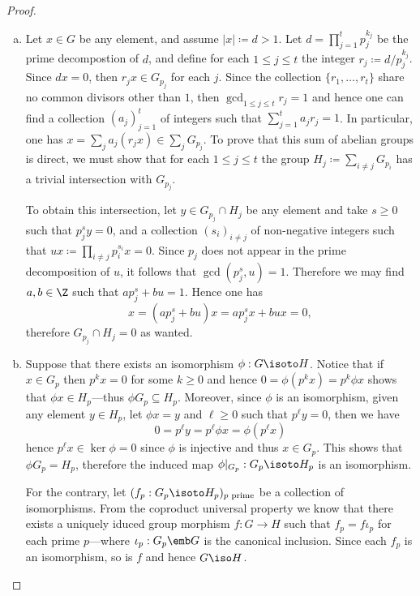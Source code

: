 \begin{proof}
\begin{enumerate}[(a)]\setlength\itemsep{0em}
\item Let \(x \in G\) be any element, and assume \(|x| \coloneq d > 1\). Let
  \(d = \prod_{j=1}^t p_j^{k_j}\) be the prime decompostion of \(d\), and define
  for each \(1 \leq j \leq t\) the integer \(r_j \coloneq d/p_j^{k_j}\). Since
  \(d x = 0\), then \(r_j x \in G_{p_j}\) for each \(j\). Since the collection
  \(\{r_1, \dots, r_t\}\) share no common divisors other than \(1\), then
  \(\gcd_{1 \leq j \leq t} r_j = 1\) and hence one can find a collection
  \((a_j)_{j=1}^t\) of integers such that \(\sum_{j=1}^t a_j r_j = 1\). In
  particular, one has \(x = \sum_j a_j (r_j x) \in \sum_j G_{p_j}\). To prove
  that this sum of abelian groups is direct, we must show that for each
  \(1 \leq j \leq t\) the group \(H_j \coloneq \sum_{i \neq j} G_{p_i}\) has a
  trivial intersection with \(G_{p_j}\).

  To obtain this intersection, let \(y \in G_{p_j} \cap H_j\) be any element and
  take \(s \geq 0\) such that \(p_j^s y = 0\), and a collection
  \((s_i)_{i \neq j}\) of non-negative integers such that
  \(u x \coloneq \prod_{i \neq j} p_i^{s_i} x = 0\). Since \(p_j\) does not
  appear in the prime decomposition of \(u\), it follows that
  \(\gcd(p_j^s, u) = 1\). Therefore we may find \(a, b \in \Z\) such that
  \(a p_j^s + b u = 1\). Hence one has
  \[
  x = (a p_j^s + b u) x = a p_j^s x + b u x = 0,
  \]
  therefore \(G_{p_j} \cap H_j = 0\) as wanted.

\item Suppose that there exists an isomorphism \(\phi: G \isoto H\). Notice that
  if \(x \in G_p\) then \(p^k x = 0\) for some \(k \geq 0\) and hence
  \(0 = \phi(p^k x) = p^k \phi x\) shows that \(\phi x \in H_p\)---thus \(\phi
  G_p \subseteq H_p\). Moreover, since \(\phi\) is an isomorphism, given any
  element \(y \in H_p\), let \(\phi x = y\) and \(\ell \geq 0\) such that
  \(p^{\ell} y = 0\), then we have
  \[
  0 = p^{\ell} y = p^{\ell} \phi x = \phi(p^{\ell} x)
  \]
  hence \(p^{\ell} x \in \ker \phi = 0\) since \(\phi\) is injective and thus
  \(x \in G_p\). This shows that \(\phi G_p = H_p\), therefore the induced map
  \(\phi|_{G_p}: G_p \isoto H_p\) is an isomorphism.

  For the contrary, let \((f_p: G_p \isoto H_p)_{p \text{ prime}}\) be a
  collection of isomorphisms. From the coproduct universal property we know that
  there exists a uniquely iduced group morphism \(f: G \to H\) such that \(f_p =
  f \iota_p\) for each prime \(p\)---where \(\iota_p: G_p \emb G\) is the
  canonical inclusion. Since each \(f_p\) is an isomorphism, so is \(f\) and
  hence \(G \iso H\).
\end{enumerate}
\end{proof}


